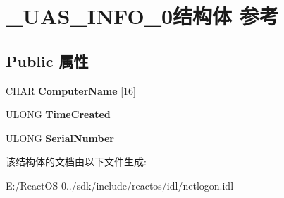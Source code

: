 \hypertarget{struct___u_a_s___i_n_f_o__0}{}\section{\+\_\+\+U\+A\+S\+\_\+\+I\+N\+F\+O\+\_\+0结构体 参考}
\label{struct___u_a_s___i_n_f_o__0}
\subsection*{Public 属性}
\begin{DoxyCompactItemize}
\item 
\mbox{\label{struct___u_a_s___i_n_f_o__0_a1247a96b45926ae96495095b6e2db7fc}} 
C\+H\+AR {\bfseries Computer\+Name} \mbox{[}16\mbox{]}
\item 
\mbox{\label{struct___u_a_s___i_n_f_o__0_a0656627121a65337e9eea76b319bcc27}} 
U\+L\+O\+NG {\bfseries Time\+Created}
\item 
\mbox{\label{struct___u_a_s___i_n_f_o__0_adc4937110d0939dddbcaeb77dddd5df3}} 
U\+L\+O\+NG {\bfseries Serial\+Number}
\end{DoxyCompactItemize}


该结构体的文档由以下文件生成\+:\begin{DoxyCompactItemize}
\item 
E\+:/\+React\+O\+S-\/0../sdk/include/reactos/idl/netlogon.\+idl\end{DoxyCompactItemize}
